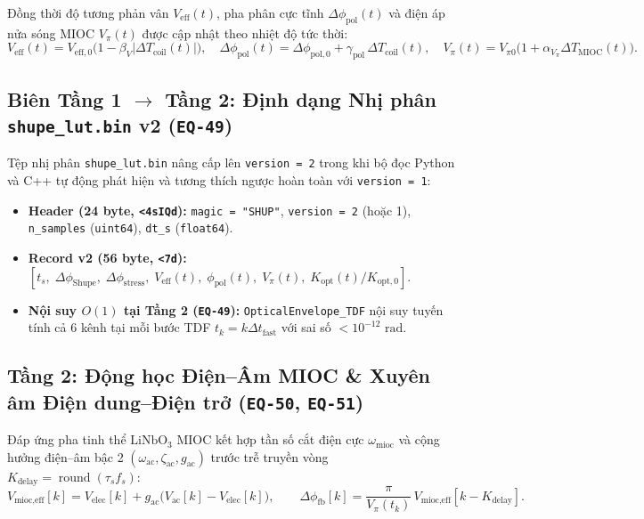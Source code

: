 \documentclass[11pt, a4paper]{article}
\begin{document}
Đồng thời độ tương phản vân $V_{\text{eff}}(t)$, pha phân cực tĩnh $\Delta\phi_{\text{pol}}(t)$ và điện áp nửa sóng MIOC $V_\pi(t)$ được cập nhật theo nhiệt độ tức thời:
\begin{equation}
V_{\text{eff}}(t) = V_{\text{eff},0}\big(1 - \beta_V |\Delta T_{\text{coil}}(t)|\big), \quad
\Delta\phi_{\text{pol}}(t) = \Delta\phi_{\text{pol},0} + \gamma_{\text{pol}}\,\Delta T_{\text{coil}}(t), \quad
V_\pi(t) = V_{\pi 0}\big(1 + \alpha_{V_\pi}\Delta T_{\text{MIOC}}(t)\big).
\tag{EQ-48}
\end{equation}

\subsection{Biên Tầng 1 $\rightarrow$ Tầng 2: Định dạng Nhị phân \texttt{shupe\_lut.bin} v2 (\texttt{EQ-49})}

Tệp nhị phân \texttt{shupe\_lut.bin} nâng cấp lên \texttt{version = 2} trong khi bộ đọc Python và C++ tự động phát hiện và tương thích ngược hoàn toàn với \texttt{version = 1}:
\begin{itemize}
\item \textbf{Header (24 byte, \texttt{<4sIQd}):} \texttt{magic = "SHUP"}, \texttt{version = 2} (hoặc 1), \texttt{n\_samples} (\texttt{uint64}), \texttt{dt\_s} (\texttt{float64}).
\item \textbf{Record v2 (56 byte, \texttt{<7d}):} $[t_s,\;\Delta\phi_{\text{Shupe}},\;\Delta\phi_{\text{stress}},\;V_{\text{eff}}(t),\;\phi_{\text{pol}}(t),\;V_\pi(t),\;K_{\text{opt}}(t)/K_{\text{opt},0}]$.
\item \textbf{Nội suy $O(1)$ tại Tầng 2 (\texttt{EQ-49}):} \texttt{OpticalEnvelope\_TDF} nội suy tuyến tính cả 6 kênh tại mỗi bước TDF $t_k = k \Delta t_{\text{fast}}$ với sai số $< 10^{-12}\text{ rad}$.
\end{itemize}

\subsection{Tầng 2: Động học Điện--Âm MIOC \& Xuyên âm Điện dung--Điện trở (\texttt{EQ-50}, \texttt{EQ-51})}

Đáp ứng pha tinh thể $\text{LiNbO}_3$ MIOC kết hợp tần số cắt điện cực $\omega_{\text{mioc}}$ và cộng hưởng điện--âm bậc 2 $(\omega_{\text{ac}}, \zeta_{\text{ac}}, g_{\text{ac}})$ trước trễ truyền vòng $K_{\text{delay}} = \operatorname{round}(\tau_s f_s)$:
\begin{equation}
V_{\text{mioc,eff}}[k] = V_{\text{elec}}[k] + g_{\text{ac}}\big(V_{\text{ac}}[k] - V_{\text{elec}}[k]\big), \qquad
\Delta\phi_{\text{fb}}[k] = \frac{\pi}{V_\pi(t_k)}\,V_{\text{mioc,eff}}[k - K_{\text{delay}}].
\tag{EQ-50}
\end{equation}
\end{document}
